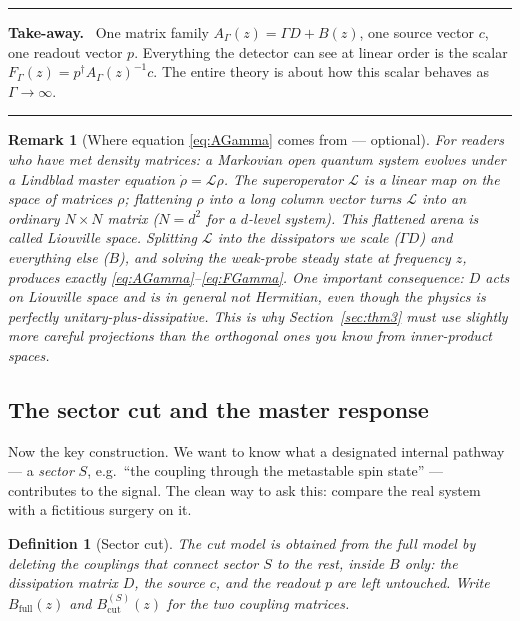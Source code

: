 \documentclass[11pt]{article}
\newtheorem{definition}{Definition}
\newtheorem{remark}{Remark}
\newenvironment{takeaway}
  {\par\medskip\noindent
   \begin{center}\begin{minipage}{0.92\textwidth}
   \hrule\medskip\noindent\textbf{Take-away.}\ }
  {\medskip\hrule\end{minipage}\end{center}\medskip}
\begin{document}
\begin{takeaway}
One matrix family $A_\Gamma(z)=\Gamma D+B(z)$, one source vector $c$, one
readout vector $p$.  Everything the detector can see at linear order is the
scalar $F_\Gamma(z)=p^\dagger A_\Gamma(z)^{-1}c$.  The entire theory is about
how this scalar behaves as $\Gamma\to\infty$.
\end{takeaway}

\begin{remark}[Where equation \eqref{eq:AGamma} comes from --- optional]
For readers who have met density matrices: a Markovian open quantum system
evolves under a Lindblad master equation
$\dot\rho=\mathcal L\rho$.  The superoperator $\mathcal L$ is a linear map on
the space of matrices $\rho$; flattening $\rho$ into a long column vector
turns $\mathcal L$ into an ordinary $N\times N$ matrix ($N=d^2$ for a
$d$-level system).  This flattened arena is called \emph{Liouville space}.
Splitting $\mathcal L$ into the dissipators we scale ($\Gamma D$) and
everything else ($B$), and solving the weak-probe steady state at frequency
$z$, produces exactly \eqref{eq:AGamma}--\eqref{eq:FGamma}.  One important
consequence: $D$ acts on Liouville space and is \emph{in general not
Hermitian}, even though the physics is perfectly unitary-plus-dissipative.
This is why Section~\ref{sec:thm3} must use slightly more careful projections
than the orthogonal ones you know from inner-product spaces.
\end{remark}

\subsection{The sector cut and the master response}
\label{sec:master}

Now the key construction.  We want to know what a designated internal pathway
--- a \emph{sector} $S$, e.g.\ ``the coupling through the metastable spin
state'' --- contributes to the signal.  The clean way to ask this: compare the
real system with a fictitious surgery on it.

\begin{definition}[Sector cut]
The \emph{cut model} is obtained from the full model by deleting the
couplings that connect sector $S$ to the rest, \emph{inside $B$ only}: the
dissipation matrix $D$, the source $c$, and the readout $p$ are left
untouched.  Write $B_{\mathrm{full}}(z)$ and $B^{(S)}_{\mathrm{cut}}(z)$ for
the two coupling matrices.
\end{definition}
\end{document}
